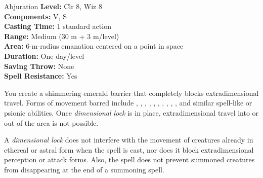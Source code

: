 {Abjuration}
{
	\textbf{Level:}
	Clr 8, Wiz 8\\
	\textbf{Components:}
	V, S\\
	\textbf{Casting Time:}
	1 standard action\\
	\textbf{Range:}
	Medium (30 m + 3 m/level)\\
	\textbf{Area:}
	6-m-radius emanation centered on a point in space\\
	\textbf{Duration:}
	One day/level\\
	\textbf{Saving Throw:}
	None\\
	\textbf{Spell Resistance:}
	Yes\\
}
{
	You create a shimmering emerald barrier that completely blocks extradimensional travel. Forms of movement barred include , , , , , , , , , , and similar spell-like or psionic abilities. Once \emph{dimensional lock} is in place, extradimensional travel into or out of the area is not possible.

	A \emph{dimensional lock} does not interfere with the movement of creatures already in ethereal or astral form when the spell is cast, nor does it block extradimensional perception or attack forms. Also, the spell does not prevent summoned creatures from disappearing at the end of a summoning spell.

}

